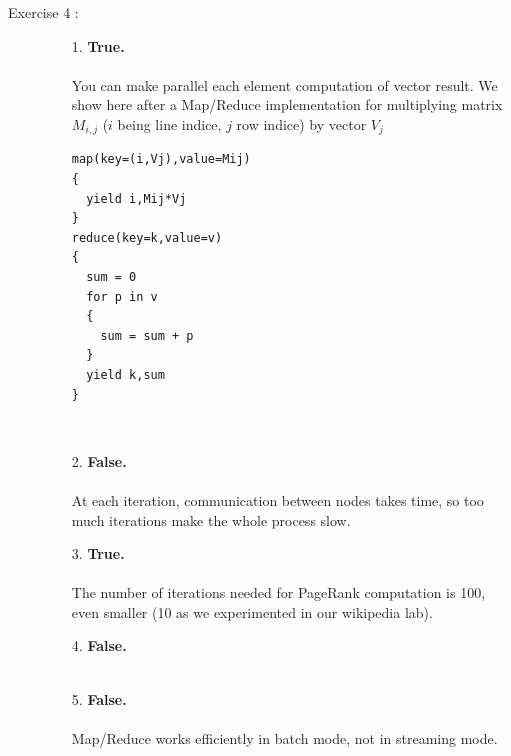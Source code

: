 \documentclass[pdftex,a4paper,DIV15]{scrartcl}
\begin{document}
\begin{description}
\item[Exercise 4 :] 

\begin{itemize}

\item[1.] \textbf{True.}\\
\\
You can make parallel each element computation of vector result. We show here after a Map/Reduce implementation
for multiplying matrix $M_{i,j}$ ($i$ being line indice, $j$ row indice) by vector $V_{j}$
\begin{verbatim}
map(key=(i,Vj),value=Mij)
{
  yield i,Mij*Vj
}
reduce(key=k,value=v)
{
  sum = 0
  for p in v
  {
    sum = sum + p
  }
  yield k,sum
}
\end{verbatim}

\\
\item[2.] \textbf{False.}\\
\\
At each iteration, communication between nodes takes time, so too much iterations make the whole process slow.
\item[3.] \textbf{True.}\\
\\
The number of iterations needed for PageRank computation is 100, even smaller (10 as we experimented in our wikipedia lab).
\item[4.] \textbf{False.}\\
\\

\item[5.] \textbf{False.}\\
\\
Map/Reduce works efficiently in batch mode, not in streaming mode.
\end{itemize}

\end{description}
\end{document}
